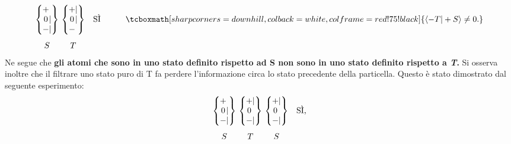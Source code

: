 \documentclass[a4paper,12pt,oneside]{book}
\begin{document}
	\begin{equation}
		\begin{matrix}
		\begin{Bmatrix}
			\makebox[\widthof{$-$}]{$+$}\makebox[\widthof{$|$}]{$\ $} \\ \makebox[\widthof{$-$}]{$0$}|\\ - | 
		\end{Bmatrix} \\[0.7cm]
			S
		\end{matrix} \
		\begin{matrix}
		\begin{Bmatrix}
 			\makebox[\widthof{$-$}]{$+$} | \\ \makebox[\widthof{$-$}]{$0$} | \\ - \makebox[\widthof{$|$}]{$\ $} 
		\end{Bmatrix} & \textrm{SÌ} & \qquad\tcboxmath[sharp corners=downhill ,colback=white,colframe=red!75!black]{\langle -T | +S \rangle \neq 0.} \\[0.7cm]
			T & &
		\end{matrix}
		\label{SG7}
	\end{equation}
Ne segue che \textbf{gli atomi che sono in uno stato definito rispetto ad S non sono in uno stato definito rispetto a \emph{T}.}
Si osserva inoltre che il filtrare uno stato puro di T fa perdere l'informazione circa lo stato precedente della particella. Questo è stato dimostrato dal seguente esperimento:
	\begin{equation}
		\begin{matrix}
		\begin{Bmatrix}
			\makebox[\widthof{$-$}]{$+$}\makebox[\widthof{$|$}]{$\ $} \\ \makebox[\widthof{$-$}]{$0$}|\\ - | 
		\end{Bmatrix} \\[0.7cm]
			S
		\end{matrix} \
		\begin{matrix}
		\begin{Bmatrix}
 			\makebox[\widthof{$-$}]{$+$} | \\ \makebox[\widthof{$-$}]{$0$}\makebox[\widthof{$|$}]{$\ $} \\ - | 
		\end{Bmatrix}  \\[0.7cm]
			T
		\end{matrix}\
		\begin{matrix}
		\begin{Bmatrix}
 			\makebox[\widthof{$-$}]{$+$} | \\ \makebox[\widthof{$-$}]{$0$}\makebox[\widthof{$|$}]{$\ $}\\ - | 
		\end{Bmatrix} &\textrm{SÌ,} \\[0.7cm]
			S &
		\end{matrix}
	\label{SG8}
	\end{equation}
\end{document}

